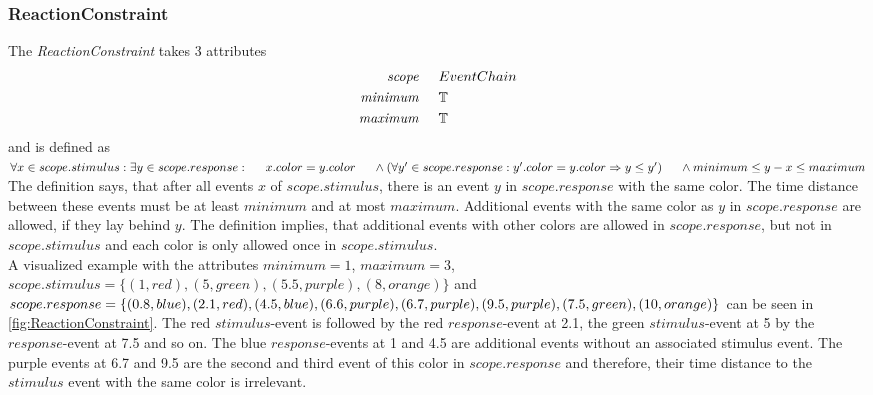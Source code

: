 	\subsubsection{ReactionConstraint}
		The \emph{ReactionConstraint} takes 3 attributes
		\begin{align*}
			\emph{scope} 	& \hspace{.5cm} EventChain\\
			\emph{minimum}	& \hspace{.5cm} \mathbb{T}\\
			\emph{maximum}	& \hspace{.5cm} \mathbb{T}
		\end{align*}
		and is defined as \\[10pt]
		\begin{math}
			\forall x\in scope.stimulus: \exists y\in scope.response:\\
			\text{\hspace{.5cm}}x.color=y.color\\
			\text{\hspace{.5cm}}\land (\forall y'\in scope.response: y'.color=y.color\Rightarrow y\leq y')\\
			\text{\hspace{.5cm}}\land minimum \leq y-x \leq maximum
		\end{math}\\[10pt]
		The definition says, that after all events $x$ of $scope.stimulus$, there is an event $y$ in $scope.response$ with the same color. The time distance between these events must be at least $minimum$ and at most $maximum$. Additional events with the same color as $y$ in $scope.response$ are allowed, if they lay behind $y$.  The definition implies, that additional events with other colors are allowed in $scope.response$, but not in $scope.stimulus$ and each color is only allowed once in $scope.stimulus$.\\
		A visualized example with the attributes $minimum=1$, $maximum=3$,\\
		$scope.stimulus=\{(1, red), (5, green), (5.5, purple), (8, orange)\}$ and $scope.response=\{(0.8, blue), (2.1, red), (4.5, blue), (6.6, purple),
		(6.7, purple), (9.5, purple), (7.5, green), \\
		(10, orange)\}$ can be seen in \ref{fig:ReactionConstraint}. The red $stimulus$-event is followed by the red $response$-event at 2.1, the green $stimulus$-event at 5 by the $response$-event at 7.5 and so on. The blue $response$-events at 1 and 4.5 are additional events without an associated stimulus event. The purple events at 6.7 and 9.5 are the second and third event of this color in $scope.response$ and therefore, their time distance to the $stimulus$ event with the same color is irrelevant.
